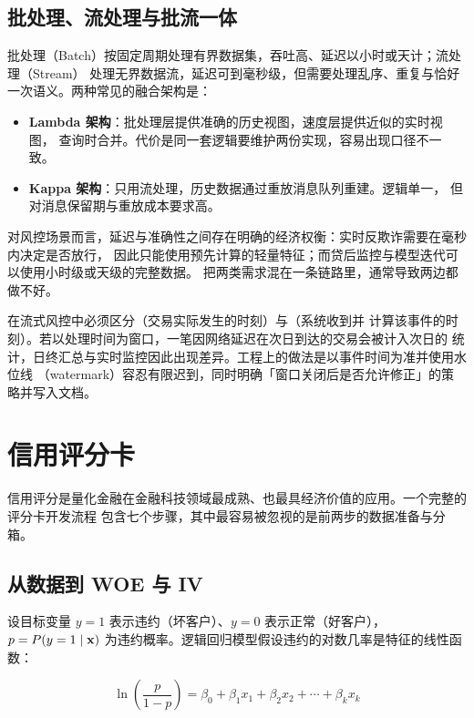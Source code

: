 \subsection{批处理、流处理与批流一体}

批处理（Batch）按固定周期处理有界数据集，吞吐高、延迟以小时或天计；流处理（Stream）
处理无界数据流，延迟可到毫秒级，但需要处理乱序、重复与恰好一次语义。两种常见的融合架构是：

\begin{itemize}[leftmargin=*]
  \item \textbf{Lambda 架构}：批处理层提供准确的历史视图，速度层提供近似的实时视图，
        查询时合并。代价是同一套逻辑要维护两份实现，容易出现口径不一致。
  \item \textbf{Kappa 架构}：只用流处理，历史数据通过重放消息队列重建。逻辑单一，
        但对消息保留期与重放成本要求高。
\end{itemize}

对风控场景而言，延迟与准确性之间存在明确的经济权衡：实时反欺诈需要在毫秒内决定是否放行，
因此只能使用预先计算的轻量特征；而贷后监控与模型迭代可以使用小时级或天级的完整数据。
把两类需求混在一条链路里，通常导致两边都做不好。

\begin{appbox}[事件时间与处理时间]
在流式风控中必须区分（交易实际发生的时刻）与（系统收到并
计算该事件的时刻）。若以处理时间为窗口，一笔因网络延迟在次日到达的交易会被计入次日的
统计，日终汇总与实时监控因此出现差异。工程上的做法是以事件时间为准并使用水位线
（watermark）容忍有限迟到，同时明确「窗口关闭后是否允许修正」的策略并写入文档。
\end{appbox}

\section{信用评分卡}

信用评分是量化金融在金融科技领域最成熟、也最具经济价值的应用。一个完整的评分卡开发流程
包含七个步骤，其中最容易被忽视的是前两步的数据准备与分箱。

\subsection{从数据到 WOE 与 IV}

设目标变量 $y=1$ 表示违约（坏客户）、$y=0$ 表示正常（好客户），$p = P(y=1\mid \mathbf{x})$
为违约概率。逻辑回归模型假设违约的对数几率是特征的线性函数：

\begin{equation}\label{eq:02-logit}
  \ln\!\left(\frac{p}{1-p}\right) = \beta_0 + \beta_1 x_1 + \beta_2 x_2 + \cdots + \beta_k x_k
\end{equation}

